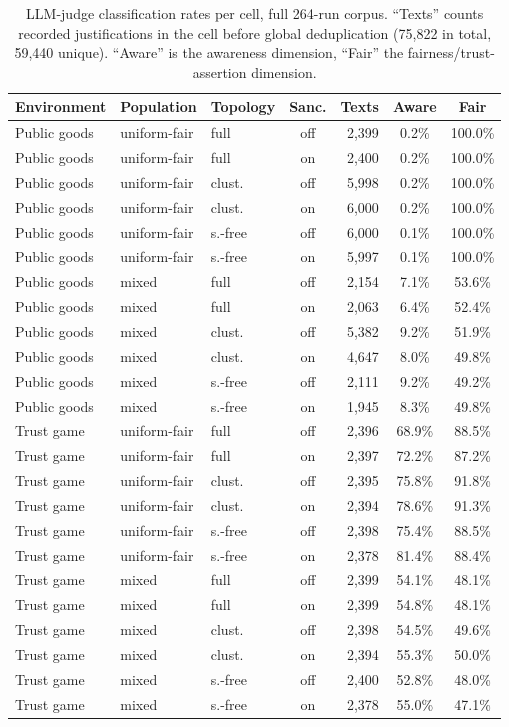 \documentclass[11pt,a4paper]{article}
\begin{document}
\begin{table}[htbp]
\centering
\scriptsize
\setlength{\tabcolsep}{4pt}
\caption{LLM-judge classification rates per cell, full 264-run
corpus. ``Texts'' counts recorded justifications in the cell before
global deduplication (75,822 in total, 59,440 unique). ``Aware'' is
the awareness dimension, ``Fair'' the fairness/trust-assertion
dimension.}
\label{tab:h2cells}
\begin{tabular}{lllcrcc}
\toprule
Environment & Population & Topology & Sanc. & Texts & Aware & Fair \\
\midrule
Public goods & uniform-fair & full & off & 2,399 & 0.2\% & 100.0\% \\
Public goods & uniform-fair & full & on & 2,400 & 0.2\% & 100.0\% \\
Public goods & uniform-fair & clust. & off & 5,998 & 0.2\% & 100.0\% \\
Public goods & uniform-fair & clust. & on & 6,000 & 0.2\% & 100.0\% \\
Public goods & uniform-fair & s.-free & off & 6,000 & 0.1\% & 100.0\% \\
Public goods & uniform-fair & s.-free & on & 5,997 & 0.1\% & 100.0\% \\
Public goods & mixed & full & off & 2,154 & 7.1\% & 53.6\% \\
Public goods & mixed & full & on & 2,063 & 6.4\% & 52.4\% \\
Public goods & mixed & clust. & off & 5,382 & 9.2\% & 51.9\% \\
Public goods & mixed & clust. & on & 4,647 & 8.0\% & 49.8\% \\
Public goods & mixed & s.-free & off & 2,111 & 9.2\% & 49.2\% \\
Public goods & mixed & s.-free & on & 1,945 & 8.3\% & 49.8\% \\
Trust game & uniform-fair & full & off & 2,396 & 68.9\% & 88.5\% \\
Trust game & uniform-fair & full & on & 2,397 & 72.2\% & 87.2\% \\
Trust game & uniform-fair & clust. & off & 2,395 & 75.8\% & 91.8\% \\
Trust game & uniform-fair & clust. & on & 2,394 & 78.6\% & 91.3\% \\
Trust game & uniform-fair & s.-free & off & 2,398 & 75.4\% & 88.5\% \\
Trust game & uniform-fair & s.-free & on & 2,378 & 81.4\% & 88.4\% \\
Trust game & mixed & full & off & 2,399 & 54.1\% & 48.1\% \\
Trust game & mixed & full & on & 2,399 & 54.8\% & 48.1\% \\
Trust game & mixed & clust. & off & 2,398 & 54.5\% & 49.6\% \\
Trust game & mixed & clust. & on & 2,394 & 55.3\% & 50.0\% \\
Trust game & mixed & s.-free & off & 2,400 & 52.8\% & 48.0\% \\
Trust game & mixed & s.-free & on & 2,378 & 55.0\% & 47.1\% \\
\bottomrule
\end{tabular}
\end{table}
\end{document}
